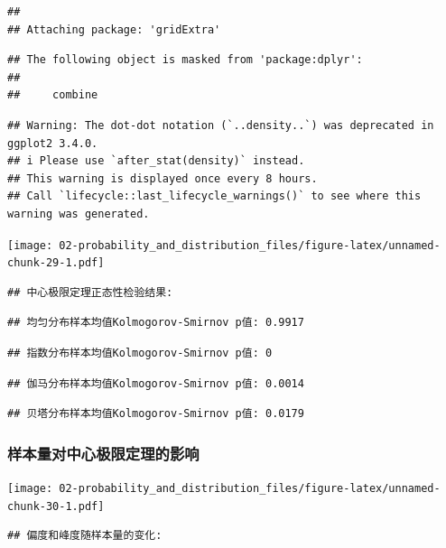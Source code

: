 \documentclass[
  twoside]{book}
\begin{document}
\begin{verbatim}
## 
## Attaching package: 'gridExtra'
\end{verbatim}

\begin{verbatim}
## The following object is masked from 'package:dplyr':
## 
##     combine
\end{verbatim}

\begin{verbatim}
## Warning: The dot-dot notation (`..density..`) was deprecated in ggplot2 3.4.0.
## i Please use `after_stat(density)` instead.
## This warning is displayed once every 8 hours.
## Call `lifecycle::last_lifecycle_warnings()` to see where this warning was generated.
\end{verbatim}

\texttt{[image: 02-probability\_and\_distribution\_files/figure-latex/unnamed-chunk-29-1.pdf]}

\begin{verbatim}
## 中心极限定理正态性检验结果:
\end{verbatim}

\begin{verbatim}
## 均匀分布样本均值Kolmogorov-Smirnov p值: 0.9917
\end{verbatim}

\begin{verbatim}
## 指数分布样本均值Kolmogorov-Smirnov p值: 0
\end{verbatim}

\begin{verbatim}
## 伽马分布样本均值Kolmogorov-Smirnov p值: 0.0014
\end{verbatim}

\begin{verbatim}
## 贝塔分布样本均值Kolmogorov-Smirnov p值: 0.0179
\end{verbatim}

\hypertarget{ux6837ux672cux91cfux5bf9ux4e2dux5fc3ux6781ux9650ux5b9aux7406ux7684ux5f71ux54cd}{%
\subsubsection{样本量对中心极限定理的影响}\label{ux6837ux672cux91cfux5bf9ux4e2dux5fc3ux6781ux9650ux5b9aux7406ux7684ux5f71ux54cd}}

\texttt{[image: 02-probability\_and\_distribution\_files/figure-latex/unnamed-chunk-30-1.pdf]}

\begin{verbatim}
## 偏度和峰度随样本量的变化:
\end{verbatim}
\end{document}
